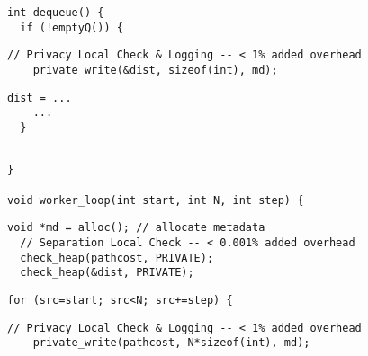 
\begin{lstlisting}[morekeywords={pathcost}, belowskip=0pt, firstnumber=10, name=dij_checks]
int dequeue() {
  if (!emptyQ()) {
\end{lstlisting}

  \begin{lstlisting}[morekeywords={pathcost,dist}, aboveskip=0pt,belowskip=0pt,backgroundcolor=\color{lightgray},
  firstnumber=auto, name=dij_checks]
    // Privacy Local Check & Logging -- < 1% added overhead
    private_write(&dist, sizeof(int), md);
  \end{lstlisting}

  \begin{lstlisting}[morekeywords={pathcost,dist},aboveskip=0pt,
  belowskip=0pt, firstnumber=auto,name=dij_checks,showlines=true]
    dist = ...
    ...
  }


  \end{lstlisting}

  \begin{lstlisting}[morekeywords={pathcost,dist},aboveskip=0pt, belowskip=0pt,
firstnumber=18,name=dij_checks]
}

void worker_loop(int start, int N, int step) {
\end{lstlisting}

  \begin{lstlisting}[morekeywords={pathcost,dist}, aboveskip=0pt,belowskip=0pt,backgroundcolor=\color{lightgray},
  firstnumber=auto, name=dij_checks]
  void *md = alloc(); // allocate metadata
  // Separation Local Check -- < 0.001% added overhead
  check_heap(pathcost, PRIVATE);
  check_heap(&dist, PRIVATE);
  \end{lstlisting}

  \begin{lstlisting}[morekeywords={pathcost},aboveskip=0pt, belowskip=0pt,
  firstnumber=25,name=dij_checks]
  for (src=start; src<N; src+=step) {
  \end{lstlisting}

  \begin{lstlisting}[morekeywords={pathcost}, aboveskip=0pt,belowskip=0pt,backgroundcolor=\color{lightgray},
  firstnumber=auto, name=dij_checks]
    // Privacy Local Check & Logging -- < 1% added overhead
    private_write(pathcost, N*sizeof(int), md);
  \end{lstlisting}

